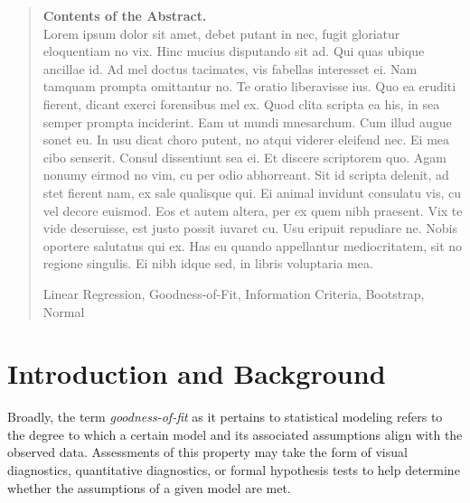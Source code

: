 \documentclass[12pt]{article} %
\renewcommand{\theequation}{\thesection\arabic{equation}}
\theoremstyle{definition}
\begin{document}
\begin{quotation}
{\bf Contents of the Abstract.}\\
Lorem ipsum dolor sit amet, debet putant in nec, fugit gloriatur eloquentiam no vix. Hinc mucius disputando sit ad. Qui quas ubique ancillae id. Ad mel doctus tacimates, vis fabellas interesset ei.
Nam tamquam prompta omittantur no. Te oratio liberavisse ius. Quo ea eruditi fierent, dicant exerci forensibus mel ex. Quod clita scripta ea his, in sea semper prompta inciderint. Eam ut mundi mnesarchum. Cum illud augue sonet eu.
In usu dicat choro putent, no atqui viderer eleifend nec. Ei mea cibo senserit. Consul dissentiunt sea ei. Et discere scriptorem quo. Agam nonumy eirmod no vim, cu per odio abhorreant.
Sit id scripta delenit, ad stet fierent nam, ex sale qualisque qui. Ei animal invidunt consulatu vis, cu vel decore euismod. Eos et autem altera, per ex quem nibh praesent. Vix te vide deseruisse, est justo possit iuvaret cu.
Usu eripuit repudiare ne. Nobis oportere salutatus qui ex. Has eu quando appellantur mediocritatem, sit no regione singulis. Ei nibh idque sed, in libris voluptaria mea.


\vspace{9pt}
Linear Regression, Goodness-of-Fit, Information Criteria, Bootstrap, Normal
\par
\end{quotation}\par



\def\thefigure{\arabic{figure}}
\def\thetable{\arabic{table}}

\renewcommand{\theequation}{\thesection.\arabic{equation}}


\fontsize{12}{14pt plus.8pt minus .6pt}\selectfont



\section{Introduction and Background}

    	Broadly, the term \textit{goodness-of-fit} as it pertains to statistical modeling refers to the degree to which a certain model
		and its associated assumptions align with the observed data. Assessments of this property may take the form of visual diagnostics, quantitative diagnostics, or formal hypothesis tests to help
		determine whether the assumptions of a given model are met.
\end{document}
